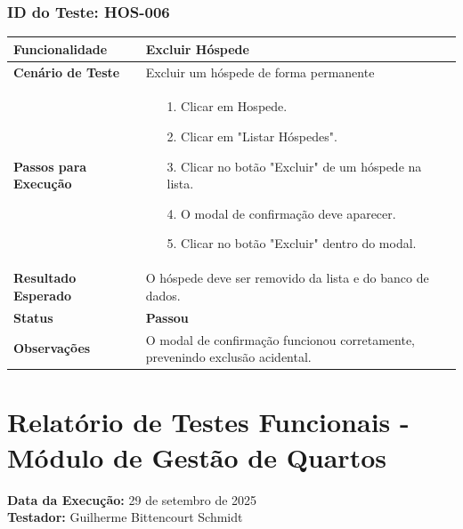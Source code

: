 \documentclass[
	12pt,				%
	openany,			%
	oneside,			%
	a4paper,			%
	english,			%
	french,				%
	spanish,			%
	brazil				%
	]{abntex2}
\begin{document}
\begin{apendicesenv}
	\subsection*{ID do Teste: HOS-006}
	\begin{tabular}{@{} p{5cm} p{11cm} @{}}
		\toprule
		\textbf{Funcionalidade} & Excluir Hóspede \\
		\midrule
		\textbf{Cenário de Teste} & Excluir um hóspede de forma permanente \\
		\midrule
		\textbf{Passos para Execução} &
		\begin{itemize} \itemsep0em 
			\item[1.] Clicar em Hospede.
			\item[2.] Clicar em "Listar Hóspedes".
			\item[3.] Clicar no botão "Excluir" de um hóspede na lista.
			\item[4.] O modal de confirmação deve aparecer.
			\item[5.] Clicar no botão "Excluir" dentro do modal.
		\end{itemize} \\
		\midrule
		\textbf{Resultado Esperado} & O hóspede deve ser removido da lista e do banco de dados. \\
		\midrule
		\textbf{Status} & \textbf{Passou} \\
		\midrule
		\textbf{Observações} & O modal de confirmação funcionou corretamente, prevenindo exclusão acidental. \\
		\bottomrule
	\end{tabular}


\chapter{Relatório de Testes Funcionais - Módulo de Gestão de Quartos}
\textbf{Data da Execução:} 29 de setembro de 2025 \\
\textbf{Testador:} Guilherme Bittencourt Schmidt \\

\vspace{1cm}



\end{apendicesenv}
\end{document}
